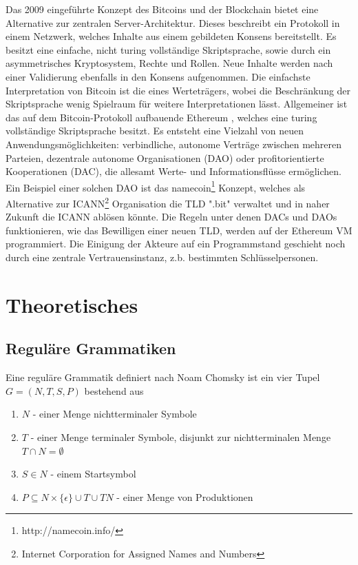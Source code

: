 \documentclass[a4paper,12pt]{report}
\begin{document}
Das 2009 eingeführte Konzept des Bitcoins und der Blockchain\cite{Nakamoto2008} bietet eine Alternative zur zentralen Server-Architektur. Dieses beschreibt ein Protokoll in einem Netzwerk, welches Inhalte aus einem gebildeten Konsens bereitstellt. Es besitzt eine einfache, nicht turing vollständige Skriptsprache, sowie durch ein asymmetrisches Kryptosystem, Rechte und Rollen. Neue Inhalte werden nach einer Validierung ebenfalls in den Konsens aufgenommen. Die einfachste Interpretation von Bitcoin ist die eines Werteträgers, wobei die Beschränkung der Skriptsprache wenig Spielraum für weitere Interpretationen lässt.
Allgemeiner ist das auf dem Bitcoin-Protokoll aufbauende Ethereum\cite{Wood2014} , welches eine turing vollständige Skriptsprache besitzt.
Es entsteht eine Vielzahl von neuen Anwendungsmöglichkeiten: verbindliche, autonome Verträge zwischen mehreren Parteien, dezentrale autonome Organisationen (DAO) oder profitorientierte Kooperationen (DAC), die allesamt Werte- und Informationsflüsse ermöglichen.
Ein Beispiel einer solchen DAO ist das namecoin\footnote{http://namecoin.info/} Konzept, welches als Alternative zur ICANN\footnote{Internet Corporation for Assigned Names and Numbers} Organisation die TLD ".bit" verwaltet und in naher Zukunft die ICANN ablösen könnte.\cite{Corporation2014} Die Regeln unter denen DACs und DAOs funktionieren, wie das Bewilligen einer neuen TLD, werden auf der Ethereum VM programmiert.
Die Einigung der Akteure auf ein Programmstand geschieht noch durch eine zentrale Vertrauensinstanz, z.b. bestimmten Schlüsselpersonen.



\section{Theoretisches}




\subsection{Reguläre Grammatiken}
Eine reguläre Grammatik definiert nach Noam Chomsky ist ein vier Tupel 
$G = (N,T,S,P)$ bestehend aus 

\begin{enumerate}
\item $N$ - einer Menge nichtterminaler Symbole 
\item $T$ - einer Menge terminaler Symbole, disjunkt zur nichtterminalen Menge $T\cap N = \emptyset$
\item $S\in N$ - einem Startsymbol
\item $P \subseteq N\times \{\epsilon\}\cup T \cup TN$ - einer Menge von Produktionen
\end{enumerate}
\end{document}
